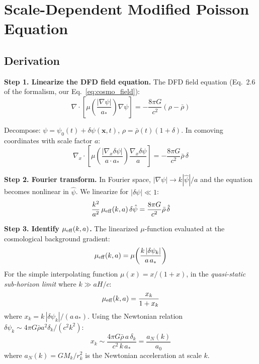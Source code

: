 \documentclass[11pt,a4paper]{article}
\begin{document}
\section{Scale-Dependent Modified Poisson Equation}
\label{sec:perturbations}

\begin{tcolorbox}[colback=blue!3!white, colframe=blue!60!black,
  title=\textbf{Finding \thesection: The Exact Scale-Dependent
  Modification}\label{find:perturbations}]

\subsection*{Derivation}

\textbf{Step 1. Linearize the DFD field equation.} The DFD field
equation (Eq.~2.6 of the formalism, our Eq.~\eqref{eq:cosmo_field}):
\begin{equation}
\nabla \cdot \left[\mu\!\left(\frac{|\nabla\psi|}{a_*}\right)
\nabla\psi\right] = -\frac{8\pi G}{c^2}(\rho - \bar{\rho})
\end{equation}

Decompose: $\psi = \psi_0(t) + \delta\psi(\mathbf{x},t)$,
$\rho = \bar{\rho}(t)(1 + \delta)$. In comoving coordinates with
scale factor $a$:
\begin{equation}
\nabla_x \cdot \left[\mu\!\left(\frac{|\nabla_x\delta\psi|}{a \cdot a_*}\right)
\frac{\nabla_x\delta\psi}{a}\right]
= -\frac{8\pi G}{c^2}\bar{\rho}\,\delta
\end{equation}

\textbf{Step 2. Fourier transform.} In Fourier space,
$|\nabla\psi| \to k|\hat{\psi}|/a$ and the equation becomes
nonlinear in $\hat{\psi}$. We linearize for $|\delta\psi| \ll 1$:
\begin{equation}
\frac{k^2}{a^2}\,\mu_{\rm eff}(k,a)\,\delta\hat{\psi}
= \frac{8\pi G}{c^2}\bar{\rho}\,\hat{\delta}
\end{equation}

\textbf{Step 3. Identify $\mu_{\rm eff}(k,a)$.} The linearized
$\mu$-function evaluated at the cosmological background gradient:
\begin{equation}
\mu_{\rm eff}(k,a) = \mu\!\left(\frac{k\,|\delta\psi_k|}{a\,a_*}\right)
\end{equation}
For the simple interpolating function $\mu(x) = x/(1+x)$, in the
\emph{quasi-static sub-horizon limit} where $k \gg aH/c$:
\begin{equation}
\mu_{\rm eff}(k,a) = \frac{x_k}{1 + x_k}
\end{equation}
where $x_k = k\,|\delta\psi_k|/(a\,a_*)$. Using the Newtonian
relation $\delta\psi_k \sim 4\pi G \bar{\rho} a^2 \delta_k / (c^2 k^2)$:
\begin{equation}
x_k \sim \frac{4\pi G \bar{\rho}\,a\,\delta_k}{c^2\,k\,a_*}
= \frac{a_N(k)}{a_0}
\end{equation}
where $a_N(k) = G M_k / r_k^2$ is the Newtonian acceleration at
scale $k$.


\end{tcolorbox}
\end{document}
